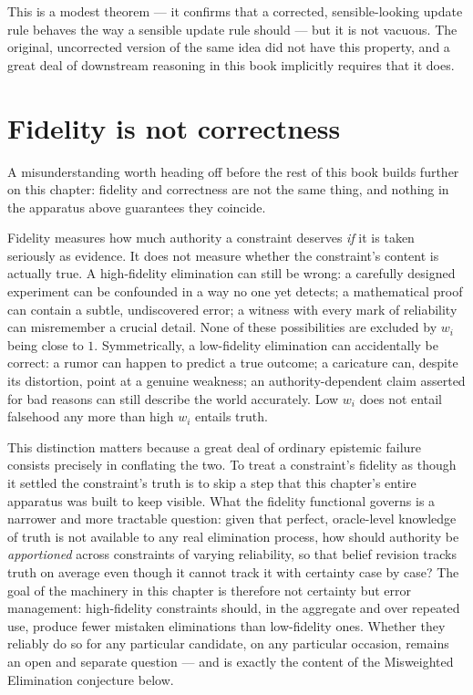 This is a modest theorem --- it confirms that a corrected, sensible-looking update rule behaves the way a sensible update rule should --- but it is not vacuous. The original, uncorrected version of the same idea did not have this property, and a great deal of downstream reasoning in this book implicitly requires that it does.

\section{Fidelity is not correctness}

A misunderstanding worth heading off before the rest of this book builds further on this chapter: fidelity and correctness are not the same thing, and nothing in the apparatus above guarantees they coincide.

Fidelity measures how much authority a constraint deserves \emph{if} it is taken seriously as evidence. It does not measure whether the constraint's content is actually true. A high-fidelity elimination can still be wrong: a carefully designed experiment can be confounded in a way no one yet detects; a mathematical proof can contain a subtle, undiscovered error; a witness with every mark of reliability can misremember a crucial detail. None of these possibilities are excluded by $w_i$ being close to $1$. Symmetrically, a low-fidelity elimination can accidentally be correct: a rumor can happen to predict a true outcome; a caricature can, despite its distortion, point at a genuine weakness; an authority-dependent claim asserted for bad reasons can still describe the world accurately. Low $w_i$ does not entail falsehood any more than high $w_i$ entails truth.

This distinction matters because a great deal of ordinary epistemic failure consists precisely in conflating the two. To treat a constraint's fidelity as though it settled the constraint's truth is to skip a step that this chapter's entire apparatus was built to keep visible. What the fidelity functional governs is a narrower and more tractable question: given that perfect, oracle-level knowledge of truth is not available to any real elimination process, how should authority be \emph{apportioned} across constraints of varying reliability, so that belief revision tracks truth on average even though it cannot track it with certainty case by case? The goal of the machinery in this chapter is therefore not certainty but error management: high-fidelity constraints should, in the aggregate and over repeated use, produce fewer mistaken eliminations than low-fidelity ones. Whether they reliably do so for any particular candidate, on any particular occasion, remains an open and separate question --- and is exactly the content of the Misweighted Elimination conjecture below.

